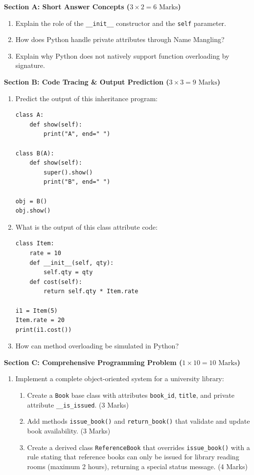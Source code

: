 \begin{chaptertest}
\noindent\textbf{Section A: Short Answer Concepts ($3 \times 2 = 6\text{ Marks}$)}
\begin{enumerate}
    \item Explain the role of the \texttt{\_\_init\_\_} constructor and the \texttt{self} parameter.
    \item How does Python handle private attributes through Name Mangling?
    \item Explain why Python does not natively support function overloading by signature.
\end{enumerate}

\medskip
\noindent\textbf{Section B: Code Tracing \& Output Prediction ($3 \times 3 = 9\text{ Marks}$)}
\begin{enumerate}[start=4]
    \item Predict the output of this inheritance program:
    \begin{lstlisting}[language=Python3]
class A:
    def show(self):
        print("A", end=" ")

class B(A):
    def show(self):
        super().show()
        print("B", end=" ")

obj = B()
obj.show()
    \end{lstlisting}
    \item What is the output of this class attribute code:
    \begin{lstlisting}[language=Python3]
class Item:
    rate = 10
    def __init__(self, qty):
        self.qty = qty
    def cost(self):
        return self.qty * Item.rate

i1 = Item(5)
Item.rate = 20
print(i1.cost())
    \end{lstlisting}
    \item How can method overloading be simulated in Python?
\end{enumerate}

\medskip
\noindent\textbf{Section C: Comprehensive Programming Problem ($1 \times 10 = 10\text{ Marks}$)}
\begin{enumerate}[start=7]
    \item Implement a complete object-oriented system for a university library:
    \begin{enumerate}[label=(\alph*)]
        \item Create a \texttt{Book} base class with attributes \texttt{book\_id}, \texttt{title}, and private attribute \texttt{\_\_is\_issued}. (3 Marks)
        \item Add methods \texttt{issue\_book()} and \texttt{return\_book()} that validate and update book availability. (3 Marks)
        \item Create a derived class \texttt{ReferenceBook} that overrides \texttt{issue\_book()} with a rule stating that reference books can only be issued for library reading rooms (maximum 2 hours), returning a special status message. (4 Marks)
    \end{enumerate}
\end{enumerate}
\end{chaptertest}

